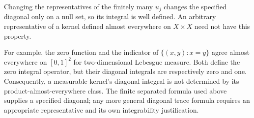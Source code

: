 \begin{remark}\label{kernel-diagonal-representatives}

Changing the representatives of the finitely many $u_j$ changes the specified diagonal only on a null set, so its integral is well defined. An arbitrary representative of a kernel defined almost everywhere on $X\times X$ need not have this property.

For example, the zero function and the indicator of $\{(x,y):x=y\}$ agree almost everywhere on $[0,1]^2$ for two-dimensional Lebesgue measure. Both define the zero integral operator, but their diagonal integrals are respectively zero and one. Consequently, a measurable kernel's diagonal integral is not determined by its product-almost-everywhere class. The finite separated formula used above supplies a specified diagonal; any more general diagonal trace formula requires an appropriate representative and its own integrability justification.
\end{remark}
